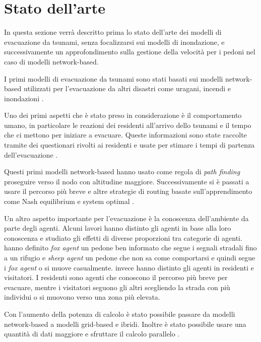 \section{Stato dell'arte}
\label{sec:stato-arte}
In questa sezione verrà descritto prima lo stato dell'arte dei modelli di evacuazione da tsunami, senza focalizzarsi sui modelli di inondazione,
e successivamente un approfondimento sulla gestione della velocità per i pedoni nel caso di modelli network-based.

I primi modelli di evacuazione da tsunami sono stati basati sui modelli network-based utilizzati per l'evacuazione da altri disastri come
uragani, incendi e inondazioni \parencite{usuzawa1997development, imamura2001development}.

Uno dei primi aspetti che è stato preso in considerazione è il comportamento umano,
in particolare le reazioni dei residenti all'arrivo dello tsunami
e il tempo che ci mettono per iniziare a evacuare.
%
Queste informazioni sono state raccolte tramite dei questionari rivolti ai residenti
e usate per stimare i tempi di partenza dell'evacuazione \parencite{imamura2001development, saito2004simulation}.

Questi primi modelli network-based hanno usato come regola di \textit{path finding}
proseguire verso il nodo con altitudine maggiore.
Successivamente si è passati a usare il percorso
più breve \parencite{katada2004disaster} e altre strategie di routing basate sull'apprendimento 
come Nash equilibrium e system optimal \parencite{lammel2009towards}.

Un altro aspetto importante per l'evacuazione è la conoscenza dell'ambiente da parte degli agenti.
Alcuni lavori hanno distinto gli agenti in base alla loro conoscenza e
studiato gli effetti di diverse proporzioni tra categorie di agenti.
\textcite{nguyen2012simulation} hanno definito \textit{fox agent} un pedone ben informato che segue i segnali
stradali fino a un rifugio e \textit{sheep agent} un pedone che non sa
come comportarsi e quindi segue i \textit{fox agent} o si muove casualmente.
\textcite{takabatake2017simulated} invece hanno distinto gli agenti in residenti e visitatori.
I residenti sono agenti che conoscono il percorso più breve per evacuare, mentre i visitatori
seguono gli altri scegliendo la strada con più individui o si muovono verso una zona più elevata.

Con l'aumento della potenza di calcolo è stato possibile passare da modelli network-based a modelli grid-based e ibridi.
Inoltre è stato possibile usare una quantità di dati maggiore e sfruttare il calcolo parallelo \parencite{wijerathne2013hpc, makinoshima2018enhancing}.


